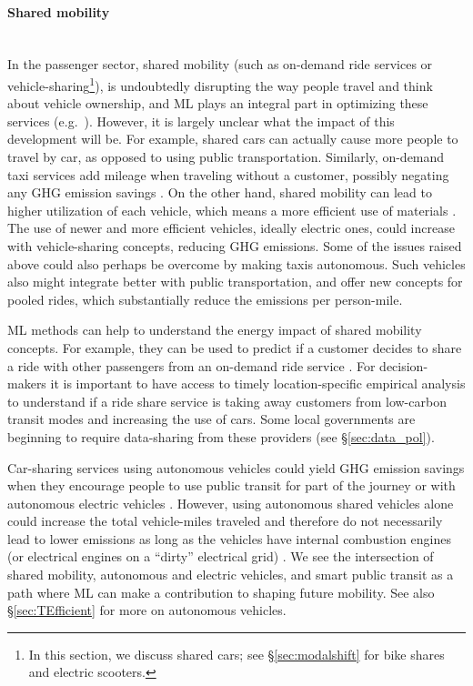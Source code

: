 \documentclass[11pt]{report}
\newcommand{\Gap}{\texorpdfstring{\hfill}{}}
\newcommand{\HighRisk}{\texorpdfstring{{\small\emph{\color{orange}{\fbox{Uncertain Impact}}}}}{}}
\begin{document}
\paragraph*{Shared mobility}\Gap\textbf{\HighRisk}\mbox{}\\In the passenger sector, shared mobility (such as on-demand ride services or vehicle-sharing\footnote{In this section, we discuss shared cars; see \S\ref{sec:modalshift} for bike shares and electric scooters.}), is undoubtedly disrupting the way people travel and think about vehicle ownership, and ML plays an integral part in optimizing these services (e.g.~\cite{8317908}). 
However, it is largely unclear what the impact of this development will be. For example, shared cars can actually cause more people to travel by car, as opposed to using public transportation. Similarly, on-demand taxi services add mileage when traveling without a customer, possibly negating any GHG emission savings \cite{suatmadi2019demand}. 
On the other hand, shared mobility can lead to higher utilization of each vehicle, which means a more efficient use of materials \cite{Hertwich_2019}. The use of newer and more efficient vehicles, ideally electric ones, could increase with vehicle-sharing concepts, reducing GHG emissions. Some of the issues raised above could also perhaps be overcome by making taxis autonomous. Such vehicles also might integrate better with public transportation, and offer new concepts for pooled rides, which substantially reduce the emissions per person-mile.

ML methods can help to understand the energy impact of shared mobility concepts.
For example, they can be used to predict if a customer decides to share a ride with other passengers from an on-demand ride service \cite{CHEN201751}. For decision-makers it is important to have access to timely location-specific empirical analysis to understand if a ride share service is taking away customers from low-carbon transit modes and increasing the use of cars. Some local governments are beginning to require data-sharing from these providers (see \S\ref{sec:data_pol}).

Car-sharing services using autonomous vehicles could yield GHG emission savings when they encourage people to use public transit for part of the journey \cite{2017-01-1276} or with autonomous electric vehicles \cite{kang2016autonous}. However, using autonomous shared vehicles alone could increase the total vehicle-miles traveled and therefore do not necessarily lead to lower emissions as long as the vehicles have internal combustion engines (or electrical engines on a ``dirty'' electrical grid) \cite{lu2018multiagent, CHEN2016243}.
We see the intersection of shared mobility, autonomous and electric vehicles, and smart public transit as a path where ML can make a contribution to shaping future mobility. See also \S\ref{sec:TEfficient} for more on autonomous vehicles.
\end{document}
